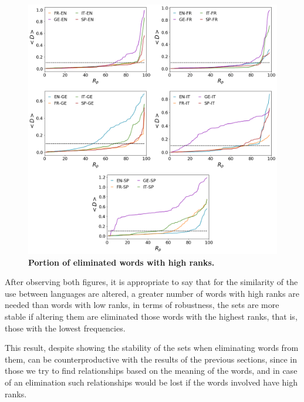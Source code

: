 \documentclass[10pt,letterpaper]{article} %
\begin{document}
\begin{figure}[!h]
	\begin{adjustwidth}{-2.5cm}{1cm}
		\centering
		\includegraphics[scale=.38]{Rp_altos.png}
		\caption{{\bf Portion of eliminated words with high ranks.} }
		\label{fig.RP_high}
	\end{adjustwidth}
\end{figure}

After observing both figures, it is appropriate to say that for the similarity of the use between languages are altered, a greater number of words with high ranks are needed than words with low ranks, in terms of robustness, the sets are more stable if altering them are eliminated those words with the highest ranks, that is, those with the lowest frequencies.

This result, despite showing the stability of the sets when eliminating words from them, can be counterproductive with the results of the previous sections, since in those we try to find relationships based on the meaning of the words, and in case of an elimination such relationships would be lost if the words involved have high ranks.


\clearpage
\end{document}
